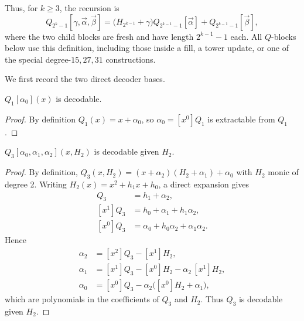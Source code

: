 Thus, for $k\ge3$, the recursion is
\begin{equation}
  Q_{2^k-1}[\gamma,\vec\alpha,\vec\beta]
  =\bigl(H_{2^{k-1}}+\gamma\bigr)Q_{2^{k-1}-1}[\vec\alpha]
    +Q_{2^{k-1}-1}[\vec\beta],
  \label{eq:peeled-Q}
\end{equation}
where the two child blocks are fresh and have length $2^{k-1}-1$ each.
All $Q$-blocks below use this definition, including those inside a fill,
a tower update, or one of the special degree-$15,27,31$ constructions.

We first record the two direct decoder bases.

\begin{lemma}
    $Q_{1}[\alpha_0](x)$ is decodable.
\end{lemma}
\begin{proof}
    By definition $Q_1(x)=x+\alpha_0$, so $\alpha_0=[x^0]Q_1$ is extractable from $Q_1$.
\end{proof}

\begin{lemma}
    $Q_{3}[\alpha_0, \alpha_1, \alpha_2](x, H_2)$ is decodable given $H_2$.
\end{lemma}
\begin{proof}
    By definition, $Q_3(x,H_2)=(x+\alpha_2)(H_2+\alpha_1)+\alpha_0$ with $H_2$ monic of degree 2.
    Writing $H_2(x)=x^2 + h_1 x + h_0$, a direct expansion gives
    \begin{align}
        [x^2]Q_3 &= h_1 + \alpha_2, \\
        [x^1]Q_3 &= h_0 + \alpha_1 + h_1\alpha_2, \\
        [x^0]Q_3 &= \alpha_0 + h_0\alpha_2 + \alpha_1\alpha_2.
    \end{align}
    Hence
    \begin{align}
        \alpha_2 &= [x^2]Q_3 - [x^1]H_2, \\
        \alpha_1 &= [x^1]Q_3 - [x^0]H_2 - \alpha_2\,[x^1]H_2, \\
        \alpha_0 &= [x^0]Q_3 - \alpha_2\bigl([x^0]H_2 + \alpha_1\bigr),
    \end{align}
    which are polynomials in the coefficients of $Q_3$ and $H_2$. Thus $Q_3$ is decodable given $H_2$.
\end{proof}

